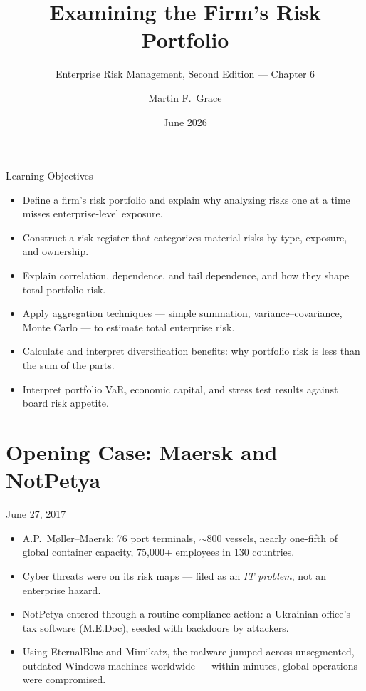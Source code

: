 \documentclass[11pt, aspectratio=169]{beamer}
\title[ERM Ch.\,6]{Examining the Firm's Risk Portfolio}
\subtitle{Enterprise Risk Management, Second Edition --- Chapter 6}
\author{Martin F.\ Grace}
\institute{University of Iowa\\[2pt] Tippie College of Business\\[2pt] Vaughan Institute of Risk Management}
\date{June 2026}
\begin{document}
\begin{frame}[plain]
\titlepage
\end{frame}

\begin{frame}{Learning Objectives}
\begin{itemize}
  \item Define a firm's \alert{risk portfolio} and explain why analyzing risks one at a time misses enterprise-level exposure.
  \item Construct a risk register that categorizes material risks by type, exposure, and ownership.
  \item Explain correlation, dependence, and \alert{tail dependence}, and how they shape total portfolio risk.
  \item Apply aggregation techniques --- simple summation, variance--covariance, Monte Carlo --- to estimate total enterprise risk.
  \item Calculate and interpret \alert{diversification benefits}: why portfolio risk is less than the sum of the parts.
  \item Interpret portfolio VaR, economic capital, and stress test results against board risk appetite.
\end{itemize}
\end{frame}

\section{Opening Case: Maersk and NotPetya}

\begin{frame}{June 27, 2017}
\begin{itemize}
  \item A.P.\ M\o ller--Maersk: 76 port terminals, $\sim$800 vessels, nearly one-fifth of global container capacity, 75{,}000+ employees in 130 countries.
  \item Cyber threats were on its risk maps --- filed as an \emph{IT problem}, not an enterprise hazard.
  \item NotPetya entered through a routine compliance action: a Ukrainian office's tax software (M.E.Doc), seeded with backdoors by attackers.
  \item Using EternalBlue and Mimikatz, the malware jumped across unsegmented, outdated Windows machines worldwide --- within minutes, global operations were compromised.
\end{itemize}
\end{frame}
\end{document}
